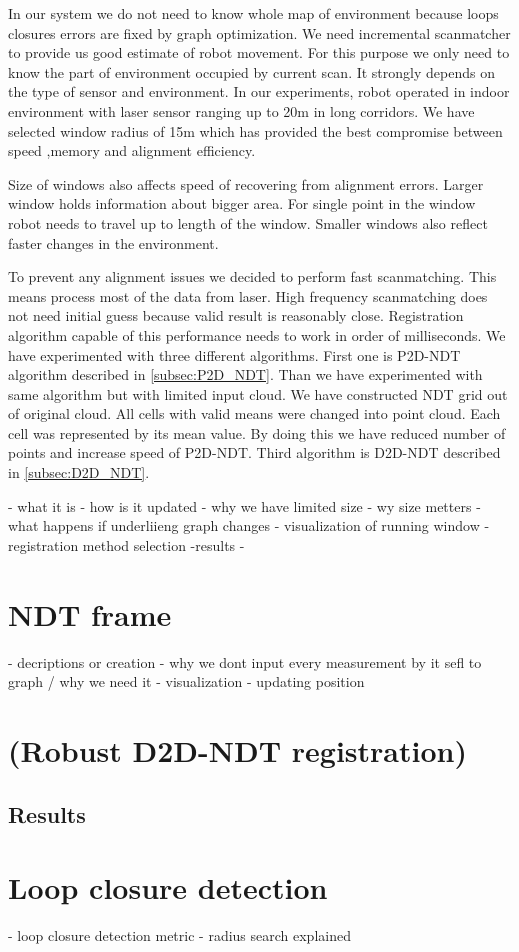 In our system we do not need to know whole map of environment because loops closures errors are fixed by graph optimization. We need incremental scanmatcher to provide us good estimate of robot movement. For this purpose we only need to know the part of environment occupied by current scan. It strongly depends on the type of sensor and environment. In our experiments, robot operated in indoor environment with laser sensor ranging up to 20m in long corridors. We have selected window radius of 15m which has provided the best compromise between speed ,memory and alignment efficiency. 

Size of windows also affects speed of recovering from alignment errors. Larger window holds information about bigger area. For single point in the window robot needs to travel up to length of the window. Smaller windows also reflect faster changes in the environment.

To prevent any alignment issues we decided to perform fast scanmatching. This means process most of the data from laser. High frequency scanmatching does not need initial guess because valid result is reasonably close.  Registration algorithm capable of this performance needs to work in order of milliseconds. We have experimented with three different algorithms. First one is \gls{P2D}-\gls{NDT} algorithm described in \ref{subsec:P2D_NDT}. Than we have experimented with same algorithm but with limited input cloud. We have constructed \gls{NDT} grid out of original cloud. All cells with valid means were changed into point cloud. Each cell was represented by its mean value. By doing this we have reduced number of points and increase speed of \gls{P2D}-NDT. Third algorithm is \gls{D2D}-\gls{NDT} described in \ref{subsec:D2D_NDT}. 






- what it is
- how is it updated
- why we have limited size
- wy size metters
-  what happens if underliieng graph changes
- visualization of running window
- registration method selection -results
- 
\newpage

\section{NDT frame}
\label{sec:NDT_frame}
- decriptions or creation
- why we dont input every measurement by it sefl to graph / why we need it
- visualization
- updating position
\newpage

\section{(Robust D2D-NDT registration)}
\label{sec:Robust D2D-NDT}

\subsection{Results}
\newpage

\newpage
\section{Loop closure detection}
\label{sec:LoopClosureMetric}
- loop closure detection metric
- radius search explained
\newpage